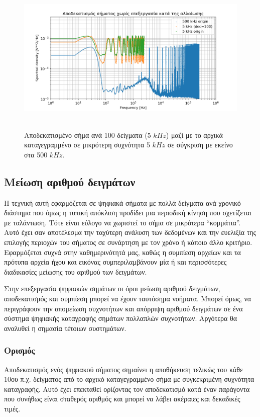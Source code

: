 \documentclass[breaklines=true, 12pt]{article}
\begin{document}
{{{\begin{figure}[htbp]
\centering
\includegraphics[width=500px,height=280px]{./decimation/with_aliasing.png}
\caption{Αποδεκατισμένο σήμα ανά 100 δείγματα (5 \(kHz\)) μαζί με το αρχικά καταγεγραμμένο σε μικρότερη συχνότητα 5 \(kHz\) σε σύγκριση με εκείνο στα 500 \(kHz\).}
\end{figure}
\subsection{Μείωση αριθμού δειγμάτων}
\label{sec:orgb1dd6b0}
Η τεχνική αυτή εφαρμόζεται σε ψηφιακά σήματα με πολλά δείγματα ανά
χρονικό διάστημα που όμως η τυπική απόκλιση προδίδει μια περιοδική
κίνηση που σχετίζεται με ταλάντωση. Τότε είναι εύλογο να χωριστεί το
σήμα σε μικρότερα “κομμάτια”. Αυτό έχει σαν αποτέλεσμα την ταχύτερη
ανάλυση των δεδομένων και την ευελιξία της επιλογής περιοχών του σήματος σε
συνάρτηση με τον χρόνο ή κάποιο άλλο κριτήριο. Εφαρμόζεται συχνά στην
καθημερινότητά μας, καθώς η συμπίεση αρχείων και τα πρότυπα αρχεία ήχου
και εικόνας συμπεριλαμβάνουν μία ή και περισσότερες διαδικασίες μείωσης
του αριθμού των δειγμάτων.

Στην επεξεργασία ψηφιακών σημάτων οι όροι μείωση αριθμού δειγμάτων,
αποδεκατισμός και συμπίεση μπορεί να έχουν ταυτόσημα νοήματα. Μπορεί όμως,
να περιγράφουν την απομείωση συχνοτήτων και απόρριψη αριθμού δειγμάτων σε
ένα σύστημα ψηφιακής καταγραφής σημάτων πολλαπλών συχνοτήτων. Αργότερα
θα αναλυθεί η σημασία τέτοιων συστημάτων.
\subsubsection{Ορισμός}
\label{sec:orgdf43ab4}
Αποδεκατισμός ενός ψηφιακού σήματος σημαίνει η αποθήκευση τελικώς του
κάθε 10ου π.χ. δείγματος από το αρχικό καταγεγραμμένο σήμα με συγκεκριμένη
συχνότητα καταγραφής. Αυτό έχει επεκταθεί ορίζοντας τον αποδεκατισμό
κατά έναν παράγοντα που συνήθως είναι σταθερός αριθμός και μπορεί να
λάβει ακέραιες και δεκαδικές τιμές.

}}}
\end{document}

